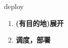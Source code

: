 
\begin{frame}
{\huge deploy}
\begin{center}
\begin{enumerate}\Large
  \item \textbf{(有目的地)展开}
  \item \textbf{调度，部署}
\end{enumerate}
\end{center}
\end{frame}
